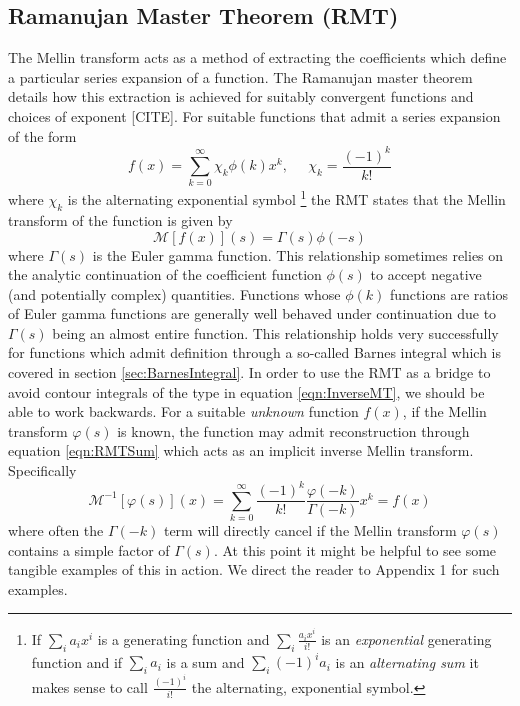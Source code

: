 \documentclass{article}
\begin{document}
\subsection{Ramanujan Master Theorem (RMT)}
The Mellin transform acts as a method of extracting the coefficients which define a particular series expansion of a function. The Ramanujan master theorem details how this extraction is achieved for suitably convergent functions and choices of exponent [CITE]. For suitable functions that admit a series expansion of the form
\begin{equation}
f(x) = \sum_{k=0}^\infty \chi_k \phi(k)x^k, \;\;\;\;\; \chi_k = \frac{(-1)^k}{k!}
\label{eqn:RMTSum}
\end{equation}
where $\chi_k$ is the alternating exponential symbol \footnote{If $\sum_i a_ix^i$ is a generating function and $\sum_i \frac{a_ix^i}{i!}$ is an \emph{exponential} generating function and if $\sum_{i} a_i$ is a sum and $\sum_i (-1)^i a_i$ is an \emph{alternating sum} it makes sense to call $\frac{(-1)^i}{i!}$ the alternating, exponential symbol.} the RMT states that the Mellin transform of the function is given by
\begin{equation}
\mathcal{M}[f(x)](s) = \Gamma(s)\phi(-s)
\end{equation}
where $\Gamma(s)$ is the Euler gamma function. This relationship sometimes relies on the analytic continuation of the coefficient function $\phi(s)$ to accept negative (and potentially complex) quantities. Functions whose $\phi(k)$ functions are ratios of Euler gamma functions are generally well behaved under continuation due to $\Gamma(s)$ being an almost entire function. This relationship holds very successfully for functions which admit definition through a so-called Barnes integral which is covered in section \ref{sec:BarnesIntegral}. In order to use the RMT as a bridge to avoid contour integrals of the type in equation \ref{eqn:InverseMT}, we should be able to work backwards. For a suitable \emph{unknown} function $f(x)$, if the Mellin transform $\varphi(s)$ is known, the function may admit reconstruction through equation \ref{eqn:RMTSum} which acts as an implicit inverse Mellin transform. Specifically
\begin{equation}
\mathcal{M}^{-1}[\varphi(s)](x) = \sum_{k=0}^\infty \frac{(-1)^k}{k!}\frac{\varphi(-k)}{\Gamma(-k)}x^k = f(x)
\label{eqn:ImplicitInverseMellin}
\end{equation}
where often the $\Gamma(-k)$ term will directly cancel if the Mellin transform $\varphi(s)$ contains a simple factor of $\Gamma(s)$. At this point it might be helpful to see some tangible examples of this in action. We direct the reader to {\color{red} Appendix 1} for such examples.
\end{document}

